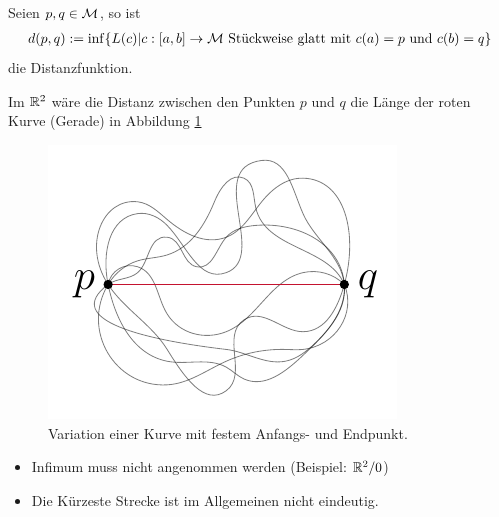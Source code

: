 \begin{defs}[Distanzfunktion]
    Seien $p, q \in \mathcal{M}$, so ist
    \begin{align}
        \label{eq:distanzfuntion}
        d(p,q) := \inf \{ L(c) \vert c : [a, b]\to \mfk \ \text{Stückweise glatt mit} \ c(a) = p \ \text{und} \ c(b) = q \}
    \end{align}
    die Distanzfunktion.
\end{defs}
\begin{bsp}
Im $\mathbb{R}^2$ wäre die Distanz zwischen den Punkten $p$ und $q$ die Länge der roten Kurve (Gerade) in Abbildung \ref{img:variation}
\begin{figure}[H]
\centering
\includegraphics[width=0.35\linewidth]{figures/tikz/variation.pdf}
\caption{Variation einer Kurve mit festem Anfangs- und Endpunkt.}
\label{img:variation}
\end{figure} 
\end{bsp}


\begin{bem}\leavevmode
    \begin{itemize}
        \item Infimum muss nicht angenommen werden (Beispiel: $\mathbb{R}^2 / 0 $)
        \item Die Kürzeste Strecke ist im Allgemeinen nicht eindeutig.
     \end{itemize}
\end{bem}
